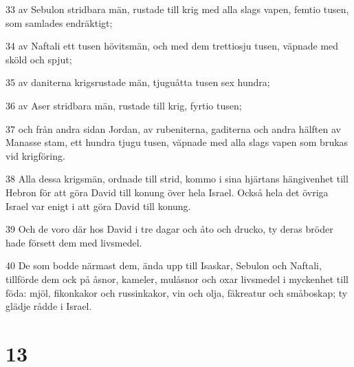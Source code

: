 \par 33 av Sebulon stridbara män, rustade till krig med alla slags vapen, femtio tusen, som samlades endräktigt;
\par 34 av Naftali ett tusen hövitsmän, och med dem trettiosju tusen, väpnade med sköld och spjut;
\par 35 av daniterna krigsrustade män, tjuguåtta tusen sex hundra;
\par 36 av Aser stridbara män, rustade till krig, fyrtio tusen;
\par 37 och från andra sidan Jordan, av rubeniterna, gaditerna och andra hälften av Manasse stam, ett hundra tjugu tusen, väpnade med alla slags vapen som brukas vid krigföring.
\par 38 Alla dessa krigsmän, ordnade till strid, kommo i sina hjärtans hängivenhet till Hebron för att göra David till konung över hela Israel. Också hela det övriga Israel var enigt i att göra David till konung.
\par 39 Och de voro där hos David i tre dagar och åto och drucko, ty deras bröder hade försett dem med livsmedel.
\par 40 De som bodde närmast dem, ända upp till Isaskar, Sebulon och Naftali, tillförde dem ock på åsnor, kameler, mulåsnor och oxar livsmedel i myckenhet till föda: mjöl, fikonkakor och russinkakor, vin och olja, fäkreatur och småboskap; ty glädje rådde i Israel.

\chapter{13}

